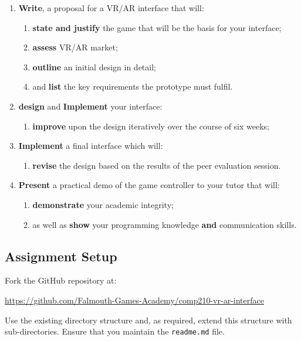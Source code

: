 \documentclass{../fal_assignment}
\begin{document}
\begin{enumerate}[label=(\Alph*)]
    \item \textbf{Write}, a proposal for a VR/AR interface that will:
    	\begin{enumerate}[label=\roman*.]
    		\item \textbf{state and justify} the game that will be the basis for your interface;
		\item \textbf{assess} VR/AR market;
		\item \textbf{outline} an initial design in detail;
		\item and \textbf{list} the key requirements the prototype must fulfil.
	\end{enumerate}
    \item \textbf{design} and \textbf{Implement} your interface:
    	\begin{enumerate}[label=\roman*.]
		\item \textbf{improve} upon the design iteratively over the course of six weeks;
	\end{enumerate}
    \item \textbf{Implement} a final interface which will:
    	\begin{enumerate}[label=\roman*.]
		\item \textbf{revise} the design based on the results of the peer evaluation session.
	\end{enumerate}
    \item \textbf{Present} a practical demo of the game controller to your tutor that will:
    	\begin{enumerate}[label=\roman*.]
    		\item \textbf{demonstrate} your academic integrity;
    		\item as well as \textbf{show} your programming knowledge \textbf{and} communication skills.
	\end{enumerate}
\end{enumerate}

\subsection*{Assignment Setup}

Fork the GitHub repository at:

\indent \url{https://github.com/Falmouth-Games-Academy/comp210-vr-ar-interface }

Use the existing directory structure and, as required, extend this structure with sub-directories. Ensure that you maintain the \texttt{readme.md} file.
\end{document}
